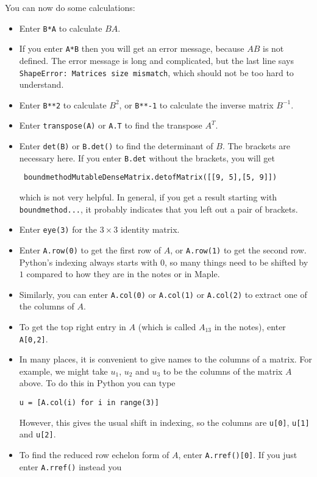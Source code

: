 \documentclass{amsart}
\begin{document}
You can now do some calculations:
\begin{itemize}
 \item Enter \verb|B*A| to calculate $BA$.
 \item If you enter \verb|A*B| then you will get an error message,
  because $AB$ is not defined.  The error message is long and
  complicated, but the last line says
  \verb|ShapeError: Matrices size mismatch|, which should not be too
  hard to understand.
 \item Enter \verb|B**2| to calculate $B^2$, or \verb|B**-1| to
  calculate the inverse matrix $B^{-1}$.
 \item Enter \verb|transpose(A)| or \verb|A.T| to find the transpose
  $A^T$.
 \item Enter \verb|det(B)| or \verb|B.det()| to find the determinant
  of $B$.  The brackets are necessary here.  If you enter \verb|B.det|
  without the brackets, you will get 
\begin{verbatim}
 boundmethodMutableDenseMatrix.detofMatrix([[9, 5],[5, 9]])
\end{verbatim}
  which is not very helpful.  In general, if you get a result starting
  with \verb|boundmethod...|, it probably indicates that you left out
  a pair of brackets.  
 \item Enter \verb|eye(3)| for the $3\times 3$ identity matrix.
 \item Enter \verb|A.row(0)| to get the first row of $A$, or
  \verb|A.row(1)| to get the second row.  Python's indexing always
  starts with 0, so many things need to be shifted by $1$ compared to
  how they are in the notes or in Maple.
 \item Similarly, you can enter \verb|A.col(0)| or \verb|A.col(1)| or
  \verb|A.col(2)| to extract one of the columns of $A$.
 \item To get the top right entry in $A$ (which is called $A_{13}$ in
  the notes), enter \verb|A[0,2]|.
 \item In many places, it is convenient to give names to the columns
  of a matrix.  For example, we might take $u_1$, $u_2$ and $u_3$ to
  be the columns of the matrix $A$ above.  To do this in Python you can
  type 
\begin{verbatim}
u = [A.col(i) for i in range(3)]
\end{verbatim}
  However, this gives the usual shift in indexing, so the columns are
  \verb|u[0]|, \verb|u[1]| and \verb|u[2]|.
 \item To find the reduced row echelon form of $A$, enter
  \verb|A.rref()[0]|.  If you just enter \verb|A.rref()| instead you

\end{itemize}
\end{document}
